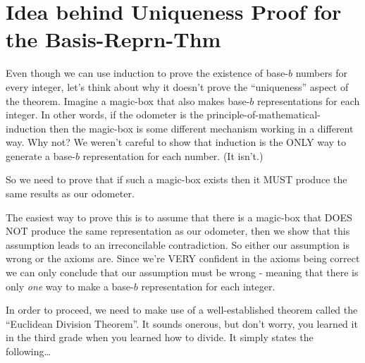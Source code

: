 \documentclass{article}
\begin{document}
\section*{Idea behind Uniqueness Proof for the Basis-Reprn-Thm}
Even though we can use induction to prove the existence of base-$b$
numbers for every integer, let's think about why it
doesn't prove the ``uniqueness'' aspect of 
the theorem.
Imagine a magic-box
that also makes base-$b$ representations for each
integer.
In other words, if the odometer is the principle-of-mathematical-induction then the magic-box
is some different mechanism working in a different way.
Why not? We weren't careful to show that induction is the ONLY way
to generate a base-$b$ representation for each number. (It isn't.)

So we need to prove that if such a magic-box exists then it MUST
produce the same results as our odometer.

The easiest way to prove this is to assume that there is a magic-box
that DOES NOT produce the same representation as our odometer, then we show that
this assumption leads to an irreconcilable contradiction.
So either our assumption is wrong or the axioms are.
Since we're VERY confident in the axioms being correct we can only 
conclude that our assumption must be wrong - meaning
that there is only \emph{one} way 
to make a base-$b$ representation for each integer.

In order to proceed, we
need to make use of a well-established theorem
called the ``Euclidean Division Theorem''.
It sounds onerous, but don't worry, you learned it
in the third grade when you learned how to divide.
It simply states the following\dots{}

\break
\end{document}
